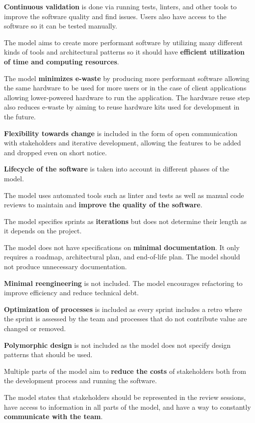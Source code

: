\textbf{Continuous validation} is done via running tests, linters, and other tools to improve the software quality and find issues. Users also have access to the software so it can be tested manually.

The model aims to create more performant software by utilizing many different kinds of tools and architectural patterns so it should have \textbf{efficient utilization of time and computing resources}.

The model \textbf{minimizes e-waste} by producing more performant software allowing the same hardware to be used for more users or in the case of client applications allowing lower-powered hardware to run the application. The hardware reuse step also reduces e-waste by aiming to reuse hardware kits used for development in the future.

\textbf{Flexibility towards change} is included in the form of open communication with stakeholders and iterative development, allowing the features to be added and dropped even on short notice.

\textbf{Lifecycle of the software} is taken into account in different phases of the model.

The model uses automated tools such as linter and tests as well as manual code reviews to maintain and \textbf{improve the quality of the software}.

The model specifies sprints as \textbf{iterations} but does not determine their length as it depends on the project.

The model does not have specifications on \textbf{minimal documentation}. It only requires a roadmap, architectural plan, and end-of-life plan. The model should not produce unnecessary documentation.

\textbf{Minimal reengineering} is not included. The model encourages refactoring to improve efficiency and reduce technical debt.

\textbf{Optimization of processes} is included as every sprint includes a retro where the sprint is assessed by the team and processes that do not contribute value are changed or removed.

\textbf{Polymorphic design} is not included as the model does not specify design patterns that should be used.

Multiple parts of the model aim to \textbf{reduce the costs} of stakeholders both from the development process and running the software.

The model states that stakeholders should be represented in the review sessions, have access to information in all parts of the model, and have a way to constantly \textbf{communicate with the team}.

